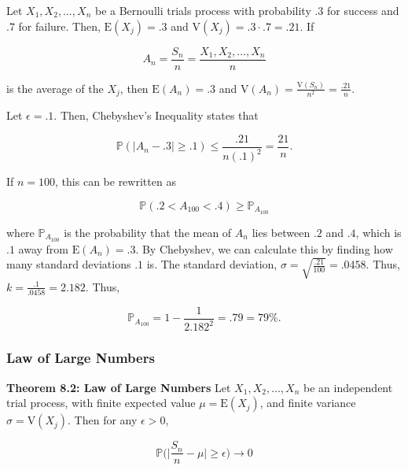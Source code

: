 \documentclass[12pt]{article}
\newcommand{\prob}[1]{\mathbb{P}(#1)}
\newcommand{\expected}[1]{\text{E}(#1)}
\newcommand{\variance}[1]{\text{V}(#1)}
\begin{document}
\vspace*{.5cm}
\begin{tcolorbox}
Let $X_1, X_2, \ldots, X_n$ be a Bernoulli trials process with probability $.3$ for success and $.7$ for failure. Then, $\expected{X_j} = .3$ and $\variance{X_j} = .3 \cdot .7 = .21$. If

\begin{equation*}
A_n = \frac{S_n}{n} = \frac{X_1, X_2, \ldots, X_n}{n}
\end{equation*}

\noindent
is the average of the $X_j$, then $\expected{A_n} = .3$ and $\variance{A_n} = \frac{\variance{S_n}}{n^2} = \frac{.21}{n}$. 

\vspace*{.3cm}
\noindent
Let $\epsilon = .1$. Then, Chebyshev's Inequality states that 

\begin{equation*}
\prob{\lvert A_n - .3 \rvert \geq .1 } \leq \frac{.21}{n(.1)^2} = \frac{21}{n}.
\end{equation*}

\noindent
If $n = 100$, this can be rewritten as 

\begin{equation*}
\prob{.2 <  A_{100} < .4 } \geq \mathbb{P}_{A_{100}}
\end{equation*}

\noindent
where $\mathbb{P}_{A_{100}}$ is the probability that the mean of $A_n$ lies between $.2$ and $.4$, which is $.1$ away from $\expected{A_n} = .3$. By Chebyshev, we can calculate this by finding how many standard deviations $.1$ is. The standard deviation, $\sigma = \sqrt{\frac{.21}{100}} = .0458$. Thus, $k = \frac{.1}{.0458} = 2.182$. Thus, 

\begin{equation*}
\mathbb{P}_{A_{100}} = 1 - \frac{1}{2.182^2} = .79 = 79\%.
\end{equation*}
\end{tcolorbox}

\subsubsection*{Law of Large Numbers}
\noindent
\textbf{Theorem 8.2: Law of Large Numbers} Let $X_1, X_2, \ldots, X_n$ be an independent trial process, with finite expected value $\mu = \expected{X_j}$, and finite variance $\sigma = \variance{X_j}$. Then for any $\epsilon > 0$,

\begin{equation*}
\mathbb{P} \Bigg ( \Bigg \lvert \frac{S_n}{n} - \mu \Bigg \rvert \geq \epsilon \Bigg ) \rightarrow 0
\end{equation*}
\end{document}
